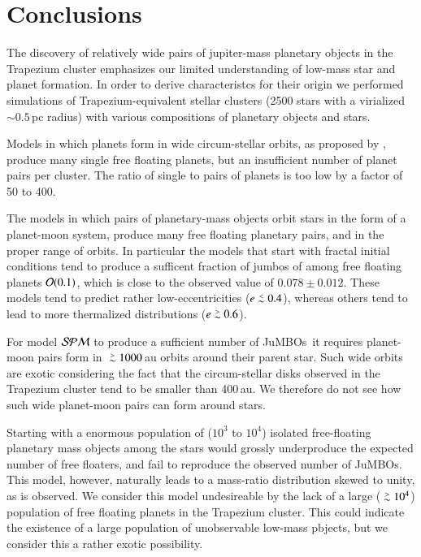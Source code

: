 \documentclass[submission,phys]{lib/SciPost}
\def\apgt{\ {\raise-.5ex\hbox{$\buildrel>\over\sim$}}\ }
\def\aplt{\ {\raise-.5ex\hbox{$\buildrel<\over\sim$}}\ }
\newcommand{\jumbos}{\mbox{JuMBOs}}
\begin{document}
\section{Conclusions}

The discovery of relatively wide pairs of jupiter-mass planetary
objects in the Trapezium cluster emphasizes our limited understanding
of low-mass star and planet formation. In order to derive
characteristcs for their origin we performed simulations of
Trapezium-equivalent stellar clusters (2500 stars with a virialized
$\sim 0.5$\,pc radius) with various compositions of planetary objects
and stars.

Models in which planets form in wide circum-stellar orbits, as
proposed by \cite{2023arXiv231006016W}, produce many single free
floating planets, but an insufficient number of planet pairs per
cluster. The ratio of single to pairs of planets is too low by a
factor of 50 to 400.

The models in which pairs of planetary-mass objects orbit stars in the
form of a planet-moon system, produce many free floating planetary
pairs, and in the proper range of orbits.  In particular the models
that start with fractal initial conditions tend to produce a sufficent
fraction of jumbos of among free floating planets ${\cal O}(0.1)$,
which is close to the observed value of $0.078\pm0.012$.  These models
tend to predict rather low-eccentricities ($e\aplt 0.4$), whereas
others tend to lead to more thermalized distributions ($e\apgt 0.6$).

For model ${\cal SPM}$ to produce a sufficient number of \jumbos\, it
requires planet-moon pairs form in $\apgt 1000$\,au orbits around
their parent star. Such wide orbits are exotic considering the fact
that the circum-stellar disks observed in the Trapezium cluster tend
to be smaller than 400\,au. We therefore do not see how such wide
planet-moon pairs can form around stars.

Starting with a enormous population of ($10^3$ to $10^4$) isolated
free-floating planetary mass objects among the stars would grossly
underproduce the expected number of free floaters, and fail to
reproduce the observed number of \jumbos.  This model, however,
naturally leads to a mass-ratio distribution skewed to unity, as is
observed. We consider this model undesireable by the lack of a large
($\apgt 10^4$) population of free floating planets in the Trapezium
cluster. This could indicate the existence of a large population of
unobservable low-mass pbjects, but we consider this a rather exotic
possibility.
\end{document}
